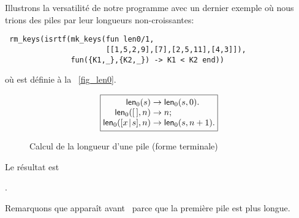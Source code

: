 Illustrons la versatilité de notre programme avec un dernier exemple
où nous trions des piles par leur longueurs non-croissantes:
\begin{verbatim}
 rm_keys(isrtf(mk_keys(fun len0/1,
                       [[1,5,2,9],[7],[2,5,11],[4,3]]),
               fun({K1,_},{K2,_}) -> K1 < K2 end))
\end{verbatim}
où  est définie à la \fig~\vref{fig_len0}.
\begin{figure}[b]
\begin{equation*}
\boxed{
\begin{array}{@{}r@{\;}l@{\;}l@{}}
\fun{len}_0(s) & \rightarrow & \fun{len}_0(s,0).\\
\fun{len}_0(\el,n) & \rightarrow & n;\\
\fun{len}_0(\cons{x}{s},n) & \rightarrow & \fun{len}_0(s,n+1).
\end{array}}
\end{equation*}
\caption{Calcul de la longueur d'une pile (forme terminale)
\label{fig_len0}}
\end{figure}
Le résultat est
\begin{center}
\erlcode{[[1,5,2,9],[2,5,11],[4,3],[7]]}.
\end{center}
Remarquons que \erlcode{[4,3]} apparaît avant~\erlcode{[7]} parce que
la première pile est plus longue.

